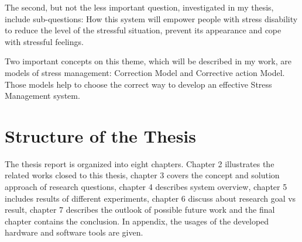 The second, but not the less important question, investigated in my thesis, include sub-questions: How this system will empower people with stress disability to reduce the level of the stressful situation, prevent its appearance and cope with stressful feelings.

Two important concepts on  this theme,  which will be described in my work, are models of stress management: Correction Model and Corrective action Model. Those models help to choose the correct way to develop an effective Stress Management system.

\section{Structure of the Thesis}
The thesis report is organized into eight chapters. Chapter 2 illustrates the related works closed to this thesis, chapter 3 covers the concept and solution approach of research questions, chapter 4 describes system overview, chapter 5 includes results of different experiments, chapter 6 discuss about research goal vs result, chapter 7 describes the outlook of possible future work and the final chapter contains the conclusion. In appendix, the usages of the developed hardware and software tools are given.
